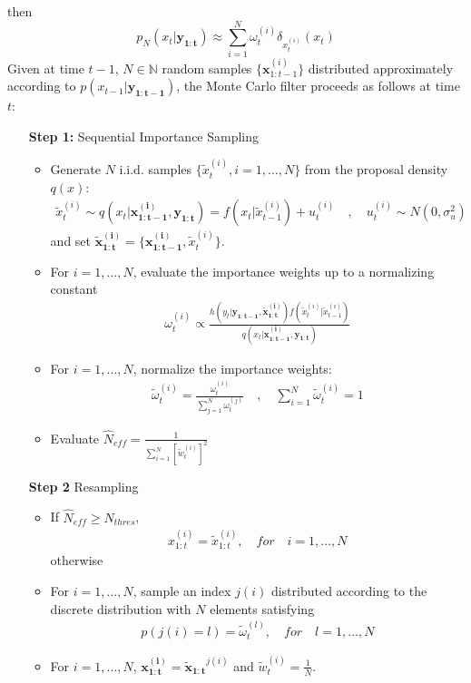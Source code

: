 then
\begin{equation}
p_{N}(x_{t}|\mathbf{y_{1:t}}) \approx \sum_{i=1}^{N}\omega_{t}^{(i)}\delta_{x_{t}^{(i)}}\left(x_{t}\right) 
\end{equation}
Given at time $t-1$, $N\in \mathbb{N}$ random samples $\{\mathbf{x}_{1:t-1}^{(i)}\}$ distributed 
approximately according to $p\left(x_{t-1}|\mathbf{y_{1:t-1}} \right) $, the Monte Carlo filter 
proceeds as follows at time $t$:
\begin{enumerate}
\item [\bf Step 1:] Sequential Importance Sampling 
\begin{itemize}
\item Generate $N$ i.i.d. samples $\{\tilde{x}_{t}^{(i)},i=1,\ldots,N \}$  
from the proposal density $q(x)$: 
\begin{align*}
\tilde{x}_{t}^{(i)}\sim
q(x_{t}|\mathbf{x_{1:t-1}^{(i)},y_{1:t}})=f(x_{t}|\tilde{x}_{t-1}^{(i)})+u_{t}^{(i)}
\quad,\quad u_{t}^{(i)} \sim N(0,\sigma_{u}^{2})
\end{align*}
and set $\mathbf{\tilde{x}_{1:t}^{(i)}=\{x_{1:t-1}^{(i)}},\tilde{x}_{t}^{(i)}\}$.
\item For $i=1,...,N$, evaluate the importance weights up to a normalizing constant
\begin{align*}
\omega_{t}^{(i)}\propto 
\frac{h\left(y_{t}|\mathbf{y_{1:t-1}}, \mathbf{\tilde{x}_{1:t}^{(i)}} \right)f\left(\tilde{x}_{t}^{(i)}| \tilde{x}_{t-1}^{(i)}\right) }
{q(x_{t}|\mathbf{x_{1:t-1}^{(i)},y_{1:t}}) }
\end{align*}
	\item For $i=1,...,N$, normalize the importance weights:
	\begin{align*}
		\tilde{\omega}_{t}^{(i)}=\frac{\omega_{t}^{(i)}}{\sum_{j=1}^{N}\omega_{t}^{(j)}}
		\quad,\quad\sum_{i=1}^{N}\tilde{\omega}_{t}^{(i)}=1
	\end{align*}
\item Evaluate $\hat{N}_{eff}=\frac{1}{\sum_{i=1}^{N}[\tilde{w}_{t}^{(i)}]^{2}}$
\end{itemize}
\item [\bf Step 2] Resampling
\begin{itemize}
\item If $\hat{N}_{eff}\geq  N_{thres}$, 
\begin{align*}
	x_{1:t}^{(i)}=\tilde{x}_{1:t}^{(i)},\quad for \quad i=1,\ldots,N
\end{align*}
otherwise
\item For $i=1,...,N$, sample an index $j(i)$ distributed according
to the discrete distribution with $N$ elements satisfying
\begin{align*}
p\left(j(i)=l \right) =\tilde{\omega}_{t}^{(l)},\quad for \quad l=1,\ldots,N
\end{align*}
\item For $i=1,...,N$,  $ \mathbf{x_{1:t}^{(i)}}=\mathbf{\tilde{x}_{1:t}}^{j(i)}$
and $\tilde{w}_{t}^{(i)}=\frac{1}{N}$.
\end{itemize}
\end{enumerate}